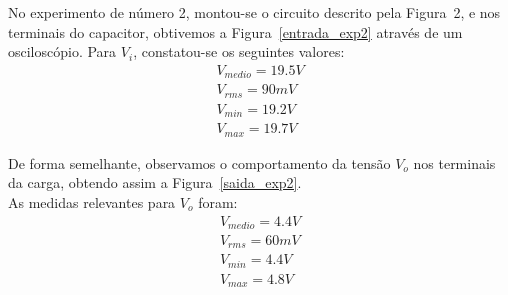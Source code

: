 \documentclass[12pt,a4paper]{article}
\begin{document}
No experimento de número 2, montou-se o circuito descrito pela Figura~2, e nos terminais do capacitor, obtivemos a Figura~\ref{entrada_exp2} através de um osciloscópio. Para $V_{i}$, constatou-se os seguintes valores:
\begin{align*}
V_{medio} = 19.5 V \\
V_{rms} = 90mV \\
V_{min} = 19.2 V \\
V_{max} = 19.7 V 
\end{align*}

De forma semelhante, observamos o comportamento da tensão $V_o$ nos terminais da carga, obtendo assim a Figura~\ref{saida_exp2}. \\ As medidas relevantes para $V_{o}$ foram:
\begin{align*}
V_{medio} = 4.4 V \\
V_{rms} = 60 mV \\
V_{min} = 4.4 V \\
V_{max} = 4.8 V 
\end{align*}
\end{document}
